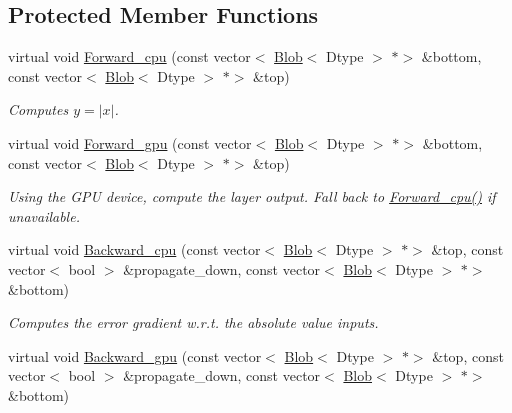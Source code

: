 \subsection*{Protected Member Functions}
\begin{DoxyCompactItemize}
\item 
virtual void \mbox{\hyperlink{classcaffe_1_1_abs_val_layer_a094d7da8c6d6eeebc7db189f4cd258f9}{Forward\+\_\+cpu}} (const vector$<$ \mbox{\hyperlink{classcaffe_1_1_blob}{Blob}}$<$ Dtype $>$ $\ast$$>$ \&bottom, const vector$<$ \mbox{\hyperlink{classcaffe_1_1_blob}{Blob}}$<$ Dtype $>$ $\ast$$>$ \&top)
\begin{DoxyCompactList}\small\item\em Computes $ y = |x| $. \end{DoxyCompactList}\item 
\mbox{\label{classcaffe_1_1_abs_val_layer_a12283057a144e9ff648a583de36b7fbd}} 
virtual void \mbox{\hyperlink{classcaffe_1_1_abs_val_layer_a12283057a144e9ff648a583de36b7fbd}{Forward\+\_\+gpu}} (const vector$<$ \mbox{\hyperlink{classcaffe_1_1_blob}{Blob}}$<$ Dtype $>$ $\ast$$>$ \&bottom, const vector$<$ \mbox{\hyperlink{classcaffe_1_1_blob}{Blob}}$<$ Dtype $>$ $\ast$$>$ \&top)
\begin{DoxyCompactList}\small\item\em Using the G\+PU device, compute the layer output. Fall back to \mbox{\hyperlink{classcaffe_1_1_abs_val_layer_a094d7da8c6d6eeebc7db189f4cd258f9}{Forward\+\_\+cpu()}} if unavailable. \end{DoxyCompactList}\item 
virtual void \mbox{\hyperlink{classcaffe_1_1_abs_val_layer_abac024a0ee583ecc7d83311363bcfa72}{Backward\+\_\+cpu}} (const vector$<$ \mbox{\hyperlink{classcaffe_1_1_blob}{Blob}}$<$ Dtype $>$ $\ast$$>$ \&top, const vector$<$ bool $>$ \&propagate\+\_\+down, const vector$<$ \mbox{\hyperlink{classcaffe_1_1_blob}{Blob}}$<$ Dtype $>$ $\ast$$>$ \&bottom)
\begin{DoxyCompactList}\small\item\em Computes the error gradient w.\+r.\+t. the absolute value inputs. \end{DoxyCompactList}\item 
\mbox{\label{classcaffe_1_1_abs_val_layer_aff44062e9eb243c195285bee25b1eefb}} 
virtual void \mbox{\hyperlink{classcaffe_1_1_abs_val_layer_aff44062e9eb243c195285bee25b1eefb}{Backward\+\_\+gpu}} (const vector$<$ \mbox{\hyperlink{classcaffe_1_1_blob}{Blob}}$<$ Dtype $>$ $\ast$$>$ \&top, const vector$<$ bool $>$ \&propagate\+\_\+down, const vector$<$ \mbox{\hyperlink{classcaffe_1_1_blob}{Blob}}$<$ Dtype $>$ $\ast$$>$ \&bottom)

\end{DoxyCompactItemize}
